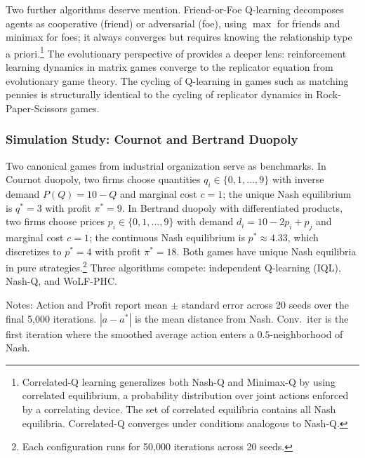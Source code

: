 Two further algorithms deserve mention. Friend-or-Foe Q-learning \citep{littman2001friend} decomposes agents as cooperative (friend) or adversarial (foe), using $\max$ for friends and minimax for foes; it always converges but requires knowing the relationship type a priori.\footnote{Correlated-Q learning \citep{greenwald2003correlated} generalizes both Nash-Q and Minimax-Q by using correlated equilibrium, a probability distribution over joint actions enforced by a correlating device. The set of correlated equilibria contains all Nash equilibria. Correlated-Q converges under conditions analogous to Nash-Q.} The evolutionary perspective of \citet{borgers1997learning} provides a deeper lens: reinforcement learning dynamics in matrix games converge to the replicator equation from evolutionary game theory. The cycling of Q-learning in games such as matching pennies is structurally identical to the cycling of replicator dynamics in Rock-Paper-Scissors games.

\subsubsection{Simulation Study: Cournot and Bertrand Duopoly}
\label{sec:cournot_bertrand}

Two canonical games from industrial organization serve as benchmarks. In Cournot duopoly, two firms choose quantities $q_i \in \{0, 1, \ldots, 9\}$ with inverse demand $P(Q) = 10 - Q$ and marginal cost $c = 1$; the unique Nash equilibrium is $q^* = 3$ with profit $\pi^* = 9$. In Bertrand duopoly with differentiated products, two firms choose prices $p_i \in \{0, 1, \ldots, 9\}$ with demand $d_i = 10 - 2p_i + p_j$ and marginal cost $c = 1$; the continuous Nash equilibrium is $p^* \approx 4.33$, which discretizes to $p^* = 4$ with profit $\pi^* = 18$. Both games have unique Nash equilibria in pure strategies.\footnote{Each configuration runs for 50,000 iterations across 20 seeds.} Three algorithms compete: independent Q-learning (IQL), Nash-Q, and WoLF-PHC.

\begin{table}[htbp]
\centering
\caption{Convergence to Nash equilibrium in Cournot and Bertrand duopoly}
\label{tab:cournot_bertrand}

\begin{minipage}{0.9\textwidth}
\footnotesize
Notes: Action and Profit report mean $\pm$ standard error across 20 seeds over the final 5,000 iterations. $|a - a^*|$ is the mean distance from Nash. Conv.\ iter is the first iteration where the smoothed average action enters a $0.5$-neighborhood of Nash.
\end{minipage}
\end{table}

